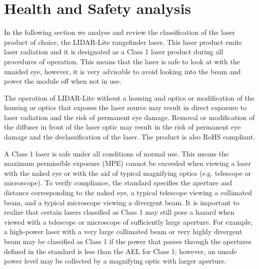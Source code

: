 \clearpage
\section{Health and Safety analysis}

In the following section we analyse and review the classification of the laser product of choice, the LIDAR-Lite rangefinder laser. This laser product emits laser radiation and it is designated as a Class 1 laser product during all procedures of operation. This means that the laser is safe to look at with the unaided eye, however, it is very advisable to avoid looking into the beam and power the module off when not in use.

The operation of LIDAR-Lite without a housing and optics or modification of the housing or optics that exposes the laser source may result in direct exposure to laser radiation and the risk of permanent eye damage. Removal or modification of the diffuser in front of the laser optic may result in the risk of permanent eye damage and the declassification of the laser. The product is also RoHS compliant.

A Class 1 laser is safe under all conditions of normal use. This means the maximum permissible exposure (MPE) cannot be exceeded when viewing a laser with the naked eye or with the aid of typical magnifying optics (e.g. telescope or microscope). To verify compliance, the standard specifies the aperture and distance corresponding to the naked eye, a typical telescope viewing a collimated beam, and a typical microscope viewing a divergent beam. It is important to realize that certain lasers classified as Class 1 may still pose a hazard when viewed with a telescope or microscope of sufficiently large aperture. For example, a high-power laser with a very large collimated beam or very highly divergent beam may be classified as Class 1 if the power that passes through the apertures defined in the standard is less than the AEL for Class 1; however, an unsafe power level may be collected by a magnifying optic with larger aperture.
